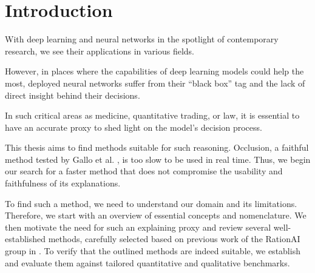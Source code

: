 \chapter{Introduction}\label{chap:introduction}

With deep learning and neural networks in the spotlight of contemporary research, we see their applications in various fields.

However, in places where the capabilities of deep learning models could help the most, deployed neural networks suffer from their ``black box'' tag and the lack of direct insight behind their decisions.

In such critical areas as medicine, quantitative trading, or law, it is essential to have an accurate proxy to shed light on the model's decision process.

This thesis aims to find methods suitable for such reasoning.
Occlusion, a faithful method tested by Gallo et al. \cite{gallo}, is too slow to be used in real time.
Thus, we begin our search for a faster method that does not compromise the usability and faithfulness of its explanations.

To find such a method, we need to understand our domain and its limitations.
Therefore, we start with an overview of essential concepts and nomenclature.
We then motivate the need for such an explaining proxy and review several well-established methods, carefully selected based on previous work of the RationAI group in  \cite{gallo, bajger-grad-cam, krajnansky-grad-cam, hruska-grad-cam}.
To verify that the outlined methods are indeed suitable, we establish and evaluate them against tailored quantitative and qualitative benchmarks.


